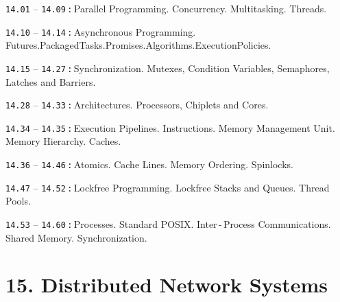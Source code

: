 \documentclass[a4paper,12pt]{article}
\renewenvironment{itemize}
{
    \begin{list}{\labelitemi}
    {
      \setlength{\topsep}{0pt}
      \setlength{\partopsep}{0pt}
      \setlength{\parskip}{0pt}
      \setlength{\itemsep}{0pt}
      \setlength{\parsep}{0pt}
      \setlength{\leftmargin}{14.5pt}
    }
}{\end{list}}
\begin{document}
\begin{itemize}

    \item \texttt{14.01} -- \texttt{14.09}\,\texttt{:}\,Parallel Programming. Concurrency. Multitasking. Threads.

    \smallskip

    \item \texttt{14.10} -- \texttt{14.14}\,\texttt{:}\,Asynchronous Programming. Futures.\:Packaged\:Tasks.\:Promises.\:Algorithms.\:Execution\:Policies.

    \smallskip

    \item \texttt{14.15} -- \texttt{14.27}\,\texttt{:}\,Synchronization. Mutexes, Condition Variables, Semaphores, Latches and Barriers.

    \smallskip

    \item \texttt{14.28} -- \texttt{14.33}\,\texttt{:}\,Architectures. Processors, Chiplets and Cores.

    \smallskip

    \item \texttt{14.34} -- \texttt{14.35}\,\texttt{:}\,Execution Pipelines. Instructions. Memory Management Unit. Memory Hierarchy. Caches.

    \smallskip

    \item \texttt{14.36} -- \texttt{14.46}\,\texttt{:}\,Atomics. Cache Lines. Memory Ordering. Spinlocks. 

    \smallskip

    \item \texttt{14.47} -- \texttt{14.52}\,\texttt{:}\,Lockfree Programming. Lockfree Stacks and Queues. Thread Pools.

    \smallskip

    \item \texttt{14.53} -- \texttt{14.60}\,\texttt{:}\,Processes. Standard POSIX. Inter\,-\,Process Communications. Shared Memory. Synchronization.
    
\end{itemize}

\section{15. Distributed Network Systems}
\end{document}
